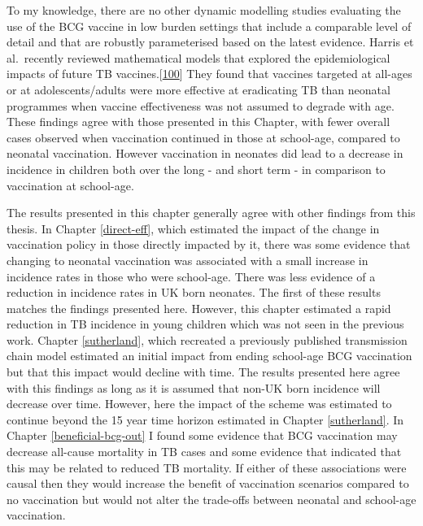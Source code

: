 \documentclass[11pt,twoside]{bristolthesis}
\begin{document}
  To my knowledge, there are no other dynamic modelling studies evaluating the use of the BCG vaccine in low burden settings that include a comparable level of detail and that are robustly parameterised based on the latest evidence. Harris et al.~recently reviewed mathematical models that explored the epidemiological impacts of future TB vaccines.{[}\protect\hyperlink{ref-Harris2016}{100}{]} They found that vaccines targeted at all-ages or at adolescents/adults were more effective at eradicating TB than neonatal programmes when vaccine effectiveness was not assumed to degrade with age. These findings agree with those presented in this Chapter, with fewer overall cases observed when vaccination continued in those at school-age, compared to neonatal vaccination. However vaccination in neonates did lead to a decrease in incidence in children both over the long - and short term - in comparison to vaccination at school-age.
  
  The results presented in this chapter generally agree with other findings from this thesis. In Chapter \ref{direct-eff}, which estimated the impact of the change in vaccination policy in those directly impacted by it, there was some evidence that changing to neonatal vaccination was associated with a small increase in incidence rates in those who were school-age. There was less evidence of a reduction in incidence rates in UK born neonates. The first of these results matches the findings presented here. However, this chapter estimated a rapid reduction in TB incidence in young children which was not seen in the previous work. Chapter \ref{sutherland}, which recreated a previously published transmission chain model estimated an initial impact from ending school-age BCG vaccination but that this impact would decline with time. The results presented here agree with this findings as long as it is assumed that non-UK born incidence will decrease over time. However, here the impact of the scheme was estimated to continue beyond the 15 year time horizon estimated in Chapter \ref{sutherland}. In Chapter \ref{beneficial-bcg-out} I found some evidence that BCG vaccination may decrease all-cause mortality in TB cases and some evidence that indicated that this may be related to reduced TB mortality. If either of these associations were causal then they would increase the benefit of vaccination scenarios compared to no vaccination but would not alter the trade-offs between neonatal and school-age vaccination.
  
\end{document}
